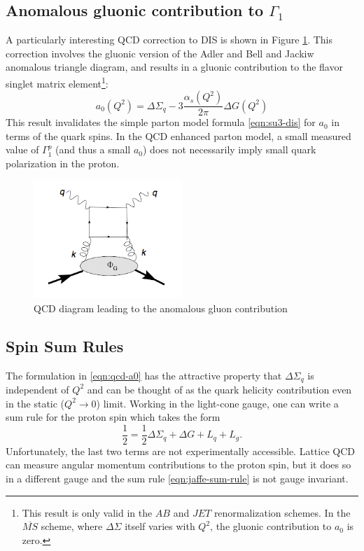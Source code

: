 \subsection{Anomalous gluonic contribution to $\Gamma_1$}

A particularly interesting QCD correction to DIS is shown in Figure
\ref{fig:box-diagram}. This correction involves the gluonic version of the Adler
\cite{Adler:1969gk} and Bell and Jackiw \cite{Bell:1969ts} anomalous triangle
diagram, and results in a gluonic contribution to the flavor singlet matrix
element\footnote{This result is only valid in the \(AB\) and \(JET\)
renormalization schemes. In the \(\overline{MS}\) scheme, where \(\Delta
\Sigma\) itself varies with \(Q^2\), the gluonic contribution to \(a_0\) is
zero.}:
%
\begin{equation}
  a_0(Q^2) = \Delta \Sigma_q - 3\frac{\alpha_s(Q^2)}{2\pi} \Delta G(Q^2)
  \label{eqn:qcd-a0}
\end{equation}
%
This result invalidates the simple parton model formula \ref{eqn:su3-dis} for
\(a_0\) in terms of the quark spins. In the QCD enhanced parton model, a small
measured value of \(\Gamma_1^p\) (and thus a small \(a_0\)) does not necessarily
imply small quark polarization in the proton.

\begin{figure}
  \centering
  \includegraphics[width=0.5\textwidth]{figures/box-diagram}
  \caption{QCD diagram leading to the anomalous gluon contribution}
  \label{fig:box-diagram}
\end{figure}

\subsection{Spin Sum Rules}

The formulation in \ref{eqn:qcd-a0} has the attractive property that \(\Delta \Sigma_q\) is independent of \(Q^2\) and can be thought of as the quark helicity contribution even in the static (\(Q^2 \rightarrow 0\)) limit. Working in the light-cone gauge, one can write a sum rule for the proton spin which takes the form \cite{Hagler:1998kg, Harindranath:1998ve, Bashinsky:1998if}
%
\begin{equation}
  \frac{1}{2} = \frac{1}{2}\Delta \Sigma_q + \Delta G + L_q + L_g.
  \label{eqn:jaffe-sum-rule}
\end{equation}
%
Unfortunately, the last two terms are not experimentally accessible.  Lattice QCD can measure angular momentum contributions to the proton spin, but it does so in a different gauge and the sum rule \ref{eqn:jaffe-sum-rule} is not gauge invariant.

